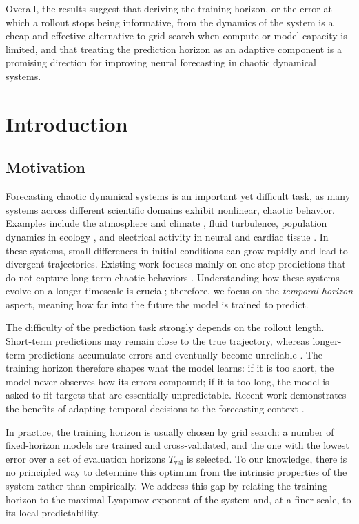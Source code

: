 \documentclass{article}
\begin{document}
Overall, the results suggest that deriving the training horizon, or the error at which a rollout stops being informative, from the dynamics of the system is a cheap and effective alternative to grid search when compute or model capacity is limited, and that treating the prediction horizon as an adaptive component is a promising direction for improving neural forecasting in chaotic dynamical systems.

\newpage

\tableofcontents
\newpage

\section{Introduction}

\subsection{Motivation}

Forecasting chaotic dynamical systems is an important yet difficult task, as many systems across different scientific domains exhibit nonlinear, chaotic behavior. Examples include the atmosphere and climate \cite{lorenz_deterministic_1963, bauer_quiet_2015}, fluid turbulence, population dynamics in ecology \cite{may_simple_1976}, and electrical activity in neural and cardiac tissue \cite{strogatz_nonlinear_1994}. In these systems, small differences in initial conditions can grow rapidly and lead to divergent trajectories. Existing work focuses mainly on one-step predictions that do not capture long-term chaotic behaviors \cite{vlachas_data-driven_2018, pathak_model-free_2018}. Understanding how these systems evolve on a longer timescale is crucial; therefore, we focus on the \emph{temporal horizon} aspect, meaning how far into the future the model is trained to predict.

The difficulty of the prediction task strongly depends on the rollout length. Short-term predictions may remain close to the true trajectory, whereas longer-term predictions accumulate errors and eventually become unreliable \cite{aceituno_temporal_2025}. The training horizon therefore shapes what the model learns: if it is too short, the model never observes how its errors compound; if it is too long, the model is asked to fit targets that are essentially unpredictable. Recent work demonstrates the benefits of adapting temporal decisions to the forecasting context \cite{pan_leapts_2026, zhang_elastst_2024}.

In practice, the training horizon is usually chosen by grid search: a number of fixed-horizon models are trained and cross-validated, and the one with the lowest error over a set of evaluation horizons $T_{\mathrm{val}}$ is selected. To our knowledge, there is no principled way to determine this optimum from the intrinsic properties of the system rather than empirically. We address this gap by relating the training horizon to the maximal Lyapunov exponent of the system and, at a finer scale, to its local predictability.
\end{document}
